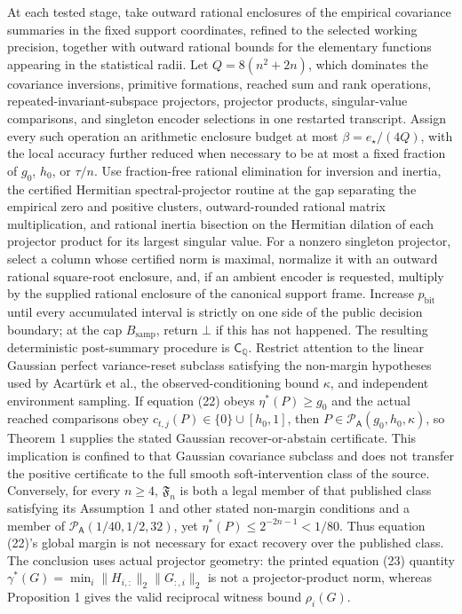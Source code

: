 At each tested stage, take outward rational enclosures of the empirical covariance summaries in the fixed support coordinates, refined to the selected working precision, together with outward rational bounds for the elementary functions appearing in the statistical radii. Let \(Q=8(n^2+2n)\), which dominates the covariance inversions, primitive formations, reached sum and rank operations, repeated-invariant-subspace projectors, projector products, singular-value comparisons, and singleton encoder selections in one restarted transcript. Assign every such operation an arithmetic enclosure budget at most \(\beta=e_{\star}/(4Q)\), with the local accuracy further reduced when necessary to be at most a fixed fraction of \(g_0\), \(h_0\), or \(\tau/n\). Use fraction-free rational elimination for inversion and inertia, the certified Hermitian spectral-projector routine at the gap separating the empirical zero and positive clusters, outward-rounded rational matrix multiplication, and rational inertia bisection on the Hermitian dilation of each projector product for its largest singular value. For a nonzero singleton projector, select a column whose certified norm is maximal, normalize it with an outward rational square-root enclosure, and, if an ambient encoder is requested, multiply by the supplied rational enclosure of the canonical support frame. Increase \(p_{\mathrm{bit}}\) until every accumulated interval is strictly on one side of the public decision boundary; at the cap \(B_{\mathrm{samp}}\), return \(\bot\) if this has not happened. The resulting deterministic post-summary procedure is \(\mathsf C_{\mathbb Q}\).
Restrict attention to the linear Gaussian perfect variance-reset subclass satisfying the non-margin hypotheses used by Acartürk et al., the observed-conditioning bound \(\kappa\), and independent environment sampling. If equation (22) obeys \(\eta^{\ast}(P)\ge g_0\) and the actual reached comparisons obey \(c_{t,j}(P)\in\{0\}\cup[h_0,1]\), then \(P\in\mathcal P_{\mathsf A}(g_0,h_0,\kappa)\), so Theorem 1 supplies the stated Gaussian recover-or-abstain certificate. This implication is confined to that Gaussian covariance subclass and does not transfer the positive certificate to the full smooth soft-intervention class of the source. Conversely, for every \(n\ge4\), \(\mathfrak F_n\) is both a legal member of that published class satisfying its Assumption 1 and other stated non-margin conditions and a member of \(\mathcal P_{\mathsf A}(1/40,1/2,32)\), yet \(\eta^{\ast}(P)\le2^{-2n-1}<1/80\). Thus equation (22)'s global margin is not necessary for exact recovery over the published class. The conclusion uses actual projector geometry: the printed equation (23) quantity \(\gamma^{\ast}(G)=\min_i\|H_{i,:}\|_2\|G_{:,i}\|_2\) is not a projector-product norm, whereas Proposition 1 gives the valid reciprocal witness bound \(\rho_i(G)\).
